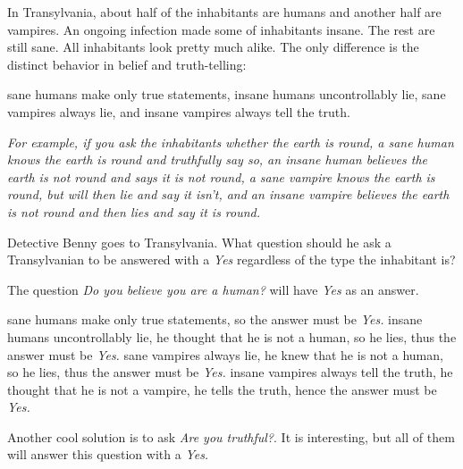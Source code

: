 \documentclass{article}
\begin{document}
\begin{example*}
    In Transylvania, about half of the inhabitants are humans and another half are vampires.
    An ongoing infection made some of inhabitants insane. The rest are still sane.
    All inhabitants look pretty much alike.
    The only difference is the distinct behavior in belief and truth-telling:
    \begin{enumerate}[topsep=0pt, partopsep=0pt, itemsep=0pt]
        \ii sane humans make only true statements,
        \ii insane humans uncontrollably lie,
        \ii sane vampires always lie, and
        \ii insane vampires always tell the truth.
    \end{enumerate}
    
    \textit{For example, if you ask the inhabitants whether the earth is round,
    a sane human knows the earth is round and truthfully say so,
    an insane human believes the earth is not round and says it is not round,
    a sane vampire knows the earth is round, but will then lie and say it isn't,
    and an insane vampire believes the earth is not round and then lies and say it is round.}

    Detective Benny goes to Transylvania.
    What question should he ask a Transylvanian to be answered with a \textit{Yes}
    regardless of the type the inhabitant is? 
\end{example*}

\begin{soln}
    The question \textit{Do you believe you are a human?} will have \textit{Yes} as an answer.

    \begin{enumerate}[topsep=0pt, partopsep=0pt, itemsep=0pt]
        \ii sane humans make only true statements, so the answer must be \textit{Yes.}
        \ii insane humans uncontrollably lie, he thought that he is not a human, so he lies,
        thus the answer must be \textit{Yes.}
        \ii sane vampires always lie, he knew that he is not a human, so he lies,
        thus the answer must be \textit{Yes.}
        \ii insane vampires always tell the truth, he thought that he is not a vampire,
        he tells the truth, hence the answer must be \textit{Yes.}
    \end{enumerate}

    Another cool solution is to ask \textit{Are you truthful?}.
    It is interesting, but all of them will answer this question with a \textit{Yes.}
\end{soln}
\end{document}
